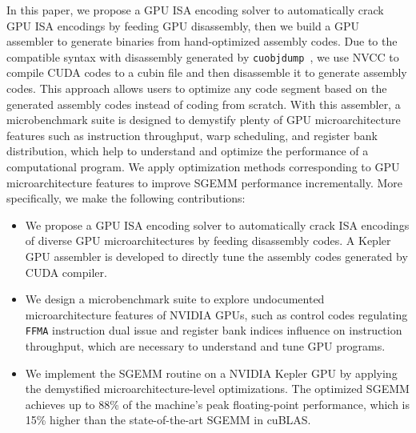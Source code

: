 In this paper, we propose a GPU ISA encoding solver to automatically crack GPU ISA encodings by feeding GPU disassembly,
then we build a GPU assembler to generate binaries from hand-optimized assembly codes. %
Due to the compatible syntax with disassembly generated by {\tt cuobjdump}~\cite{cubin2015util}, we use NVCC
to compile CUDA codes to a cubin file and then disassemble it to generate assembly codes.
This approach allows users to optimize any code segment based on the generated assembly codes instead of coding from scratch. 
With this assembler, a microbenchmark suite is designed to 
demystify plenty of GPU microarchitecture features such as instruction
throughput, warp scheduling, and register bank distribution, which help to
understand and optimize the performance of a computational program. 
We apply optimization methods corresponding to GPU microarchitecture features to improve SGEMM performance incrementally. 
More specifically, we make the following contributions:

\begin{itemize}
\item We propose a GPU ISA encoding solver to automatically crack ISA encodings
     of diverse GPU microarchitectures by feeding disassembly codes.
A Kepler GPU assembler is developed to directly tune the assembly codes generated by CUDA compiler.
\item We design a microbenchmark suite to explore undocumented
microarchitecture features of NVIDIA GPUs, such as control codes regulating
{\tt FFMA} instruction dual issue and register bank indices influence on
instruction throughput, which are necessary to understand and tune GPU
programs.
\item We implement the SGEMM routine on a NVIDIA Kepler GPU by applying the demystified microarchitecture-level optimizations. 
The optimized SGEMM achieves up to 88\% of the machine's peak floating-point performance, which is 15\% higher than the state-of-the-art SGEMM in cuBLAS.
\end{itemize}


